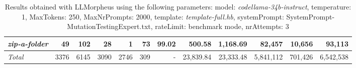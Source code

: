 \begin{table*}
{\begin{tabular}{l||r|r|r|r|r|r||r|r||r|r|r}
   \hline
   \textit{zip-a-folder} & 49 & 102 & 28 & 1 & 73 & 99.02 & 500.58 & 1,168.69 & 82,457 & 10,656 & 93,113 \\ 
   \hline
   \textit{Total} & 3376 & 6145 & 3090 & 2746 & 309 & - & 23,839.84  & 23,333.48 & 5,841,112 & 701,426 & 6,542,538 \\ 
 \end{tabular}
 }
 \caption{Results obtained with LLMorpheus using the following parameters: 
   model: \textit{codellama-34b-instruct}, 
   temperature: 1, 
   MaxTokens: 250, 
   MaxNrPrompts: 2000, 
   template: \textit{template-full.hb}, 
   systemPrompt: SystemPrompt-MutationTestingExpert.txt, 
   rateLimit: benchmark mode, 
   nrAttempts: 3  
 }
\end{table*}

